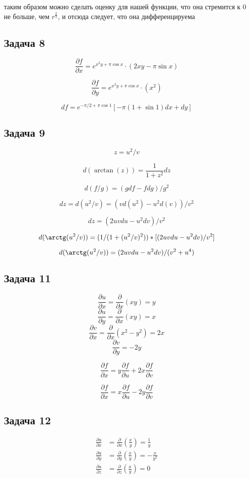 \documentclass[a4paper,12pt]{article}
\begin{document}
таким образом можно сделать оценку для нашей функции, что она стремится к 0 не больше, чем $r^\frac{2}{3}$, и отсюда следует, что она дифференцируема

\subsection{Задача 8}

\[
\frac{\partial f}{\partial x} = e^{x^2 y+\pi \cos x} \cdot (2xy - \pi \sin x)
\]

\[
\frac{\partial f}{\partial y} = e^{x^2 y+\pi \cos x} \cdot (x^2)
\]

\[
df = e^{-\pi/2+\pi \cos 1} \left[ -\pi(1 + \sin 1) dx + dy \right]
\]

\subsection{Задача 9}
\[
z = u^2/v
\]

\[
d(\arctan(z)) = \frac{1}{1+z^2}dz
\]

\[
d(f/g) = (g df - f dg)/g^2
\]

\[
dz = d(u^2/v) = (vd(u^2)-u^2d(v))/v^2
\]

\[
dz = (2uv du - u^2 dv) / v^2
\]

\[
d(\arctg(u^2/v)) = (1 / (1 + (u^2/v)^2)) * [(2uv du - u^2 dv) / v^2]
\]

\[
d(\arctg(u^2/v)) = (2uv du - u^2 dv) / (v^2 + u^4)
\]

\subsection{Задача 11}
\[
\frac{\partial u}{\partial x} = \frac{\partial}{\partial x} (xy) = y
\]
\[
\frac{\partial u}{\partial y} = \frac{\partial}{\partial x} (xy) = x
\]
\[
\frac{\partial v}{\partial x} = \frac{\partial}{ \partial x} (x^2-y^2) = 2x
\]
\[
\frac{\partial v}{\partial y} = -2y
\]

\[
\frac{\partial f}{\partial x} = y\frac{\partial f}{\partial u} + 2x \frac{\partial f}{\partial v}
\]

\[
\frac{\partial f}{\partial x} = x \frac{\partial f}{ \partial u} - 2y \frac{\partial f}{\partial v}
\]

\subsection{Задача 12} 



\begin{align*}
\frac{\partial u}{\partial x} &= \frac{\partial}{\partial x} \left(\frac{x}{y}\right) = \frac{1}{y} \\
\frac{\partial u}{\partial y} &= \frac{\partial}{\partial y} \left(\frac{x}{y}\right) = -\frac{x}{y^2} \\
\frac{\partial u}{\partial z} &= \frac{\partial}{\partial z} \left(\frac{x}{y}\right) = 0
\end{align*}
\end{document}
